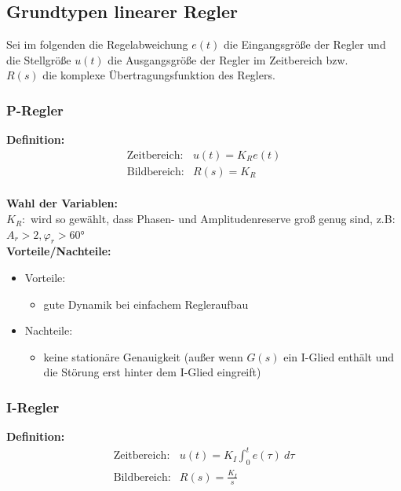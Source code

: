 \documentclass[10pt,a4paper]{article}
\begin{document}
\subsection{Grundtypen linearer Regler}
Sei im folgenden die Regelabweichung $e(t)$ die Eingangsgröße der Regler und die Stellgröße $u(t)$ die Ausgangsgröße der Regler im Zeitbereich bzw. \\
$R(s)$ die komplexe Übertragungsfunktion des Reglers.

\subsubsection{P-Regler}
\textbf{Definition:}
$$
	\begin{array}{ll}
	\text{Zeitbereich:} & u(t) = K_R e(t) \\
	\text{Bildbereich:} & R(s) = K_R
	\end{array}
$$ \\

\textbf{Wahl der Variablen:} \\
$K_R:$ wird so gewählt, dass Phasen- und Amplitudenreserve groß genug sind, z.B: $A_r > 2, \varphi_r > 60°$ \\

\textbf{Vorteile/Nachteile:}
\begin{itemize}
	\item Vorteile:
	\begin{itemize}
		\item gute Dynamik bei einfachem Regleraufbau
	\end{itemize}
	\item Nachteile:
	\begin{itemize}
		\item keine stationäre Genauigkeit (außer wenn $G(s)$ ein I-Glied enthält und die Störung erst hinter dem I-Glied eingreift)
	\end{itemize}
\end{itemize}

\subsubsection{I-Regler}
\textbf{Definition:}
$$
	\begin{array}{ll}
	\text{Zeitbereich:} & u(t) = K_I \int_0^t e(\tau) ~d\tau \\
	\text{Bildbereich:} & R(s) = \frac{K_I}{s}
	\end{array}
$$ \\
\end{document}
